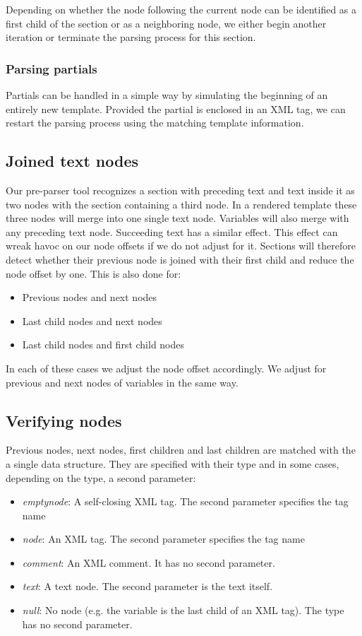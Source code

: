Depending on whether the node following the current node can be identified as
a first child of the section or as a neighboring node, we either begin another
iteration or terminate the parsing process for this section.

\subsubsection{Parsing partials}
\label{sec:parsing-partials}
Partials can be handled in a simple way by simulating the beginning of an
entirely new template. Provided the partial is enclosed in an XML tag, we can
restart the parsing process using the matching template information.

\subsection{Joined text nodes}
\label{sec:joined}
Our pre-parser tool recognizes a section with preceding text and text inside it
as two nodes with the section containing a third node. In a rendered template
these three nodes will merge into one single text node. Variables will also
merge with any preceding text node. Succeeding text has a similar effect.
This effect can wreak havoc on our node offsets if we do not adjust for it.
Sections will therefore detect whether their previous node is joined with
their first child and reduce the node offset by one. This is also done for:
\begin{itemize}
\item Previous nodes and next nodes
\item Last child nodes and next nodes
\item Last child nodes and first child nodes
\end{itemize}

In each of these cases we adjust the node offset accordingly. We adjust
for previous and next nodes of variables in the same way.

\subsection{Verifying nodes}
Previous nodes, next nodes, first children and last children are matched with
the a single data structure.
They are specified with their type and in some cases, depending on the type,
a second parameter:
\begin{itemize}
\item \emph{emptynode}: A self-closing XML tag. The second parameter specifies
                        the tag name
\item \emph{node}:      An XML tag. The second parameter specifies
                        the tag name
\item \emph{comment}:   An XML comment. It has no second parameter.
\item \emph{text}:      A text node. The second parameter is the text itself.
\item \emph{null}:      No node (e.g. the variable is the
                        last child of an XML tag). The type has no second
                        parameter.
\end{itemize}

